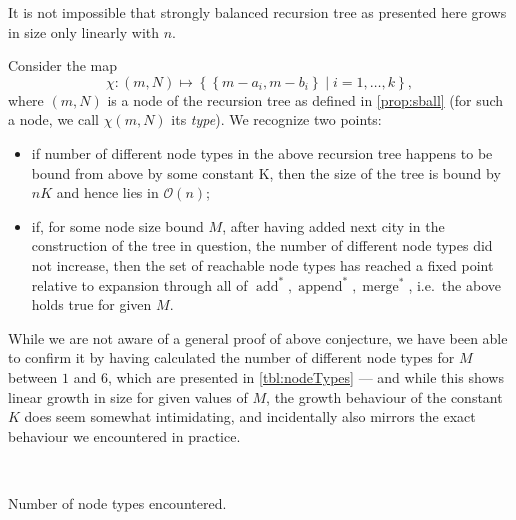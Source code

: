 \documentclass[index=totoc,bibliography=totoc]{scrartcl}
\newcommand{\annotation}[1]{\marginpar{\small\itshape\color{green}#1}}
\numberwithin{equation}{section}
\numberwithin{figure}{section}
\numberwithin{table}{section}
\let\defstyle\itshape
\begin{document}
It is not impossible that strongly balanced recursion tree as presented
here grows in size only linearly with $n$.

Consider the map
\[
  \chi : \left(m,N\right) \mapsto \left\{\left\{m-a_i,m-b_i\right\} \mid i = 1,\ldots,k \right\},
\]
where $\left(m,N\right)$ is a node of the recursion tree as defined in \cref{prop:sball}
(for such a node, we call $\chi\left(m,N\right)$ its {\defstyle type}).
We recognize two points:
\begin{itemize}
  \item
    if number of different node types in the above recursion tree happens
    to be bound from above by some constant K, then the size of the tree is
    bound by $nK$ and hence lies in $\mathcal{O}\left(n\right)$;
  \item
    \annotation{prove second point}
    if, for some node size bound $M$, after having added next city in the
    construction of the tree in question, the number of different node
    types did not increase, then the set of reachable node types has
    reached a fixed point relative to expansion through all of
    $\operatorname{add}^*, \operatorname{append}^*,
    \operatorname{merge}^*$, i.e.\ the above holds true for given $M$.
\end{itemize}

While we are not aware of a general proof of above conjecture, we have been
able to confirm it by having calculated the number of different node types
for $M$ between $1$ and $6$, which are presented in \cref{tbl:nodeTypes}
--- and while this shows linear growth in size for given values of $M$, the
growth behaviour of the constant $K$ does seem somewhat intimidating, and
incidentally also mirrors the exact behaviour we encountered in practice.

\setlength{\aboverulesep}{0pt}
\setlength{\belowrulesep}{0pt}
\renewcommand{\tabcolsep}{9pt}
\setlength{\extrarowheight}{1.1ex}

\begin{table}[htb]
\centering
    \mbox{%
    }
\caption{Number of node types encountered.}%
\label{tbl:nodeTypes}%
\end{table}
\end{document}
